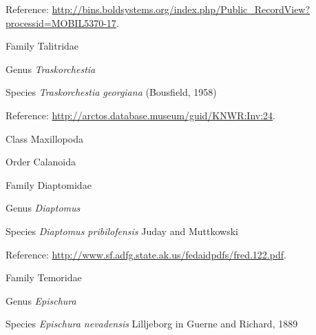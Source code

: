 \documentclass[9pt, article]{memoir}
\begin{document}
\begin{multicols}{2}
\vspace{6pt}Reference: 
\url{http://bins.boldsystems.org/index.php/Public_RecordView?processid=MOBIL5370-17}.

\vspace{6pt}\noindent\hspace{24pt}Family Talitridae


\vspace{6pt}\noindent\hspace{30pt}Genus \textit{Traskorchestia}


\vspace{6pt}\noindent\hspace{36pt}Species \textit{Traskorchestia georgiana} (Bousfield, 1958)


\vspace{6pt}Reference: 
\url{http://arctos.database.museum/guid/KNWR:Inv:24}.

\vspace{6pt}\noindent\hspace{12pt}Class Maxillopoda


\vspace{6pt}\noindent\hspace{18pt}Order Calanoida


\vspace{6pt}\noindent\hspace{24pt}Family Diaptomidae


\vspace{6pt}\noindent\hspace{30pt}Genus \textit{Diaptomus}


\vspace{6pt}\noindent\hspace{36pt}Species \textit{Diaptomus pribilofensis} Juday and Muttkowski


\vspace{6pt}Reference: 
\url{http://www.sf.adfg.state.ak.us/fedaidpdfs/fred.122.pdf}.

\vspace{6pt}\noindent\hspace{24pt}Family Temoridae


\vspace{6pt}\noindent\hspace{30pt}Genus \textit{Epischura}


\vspace{6pt}\noindent\hspace{36pt}Species \textit{Epischura nevadensis} Lilljeborg in Guerne and Richard, 1889



\end{multicols}
\end{document}
